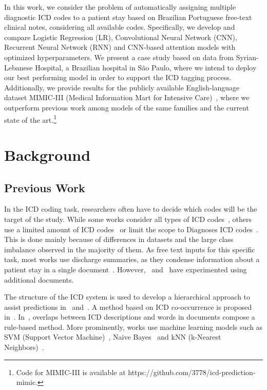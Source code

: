 \documentclass[runningheads]{llncs}
\begin{document}
In this work, we consider the problem of automatically assigning multiple diagnostic ICD codes to a patient stay based on Brazilian Portuguese free-text clinical notes, considering all available codes. Specifically, we develop and compare Logistic Regression (LR), Convolutional Neural Network (CNN), Recurrent Neural Network (RNN) and CNN-based attention models with optimized hyperparameters. We present a case study based on data from Syrian-Lebanese Hospital, a Brazilian hospital in São Paulo, where we intend to deploy our best performing model in order to support the ICD tagging process. Additionally, we provide results for the publicly available English-language dataset MIMIC-III (Medical Information Mart for Intensive Care)~\cite{johnsonMIMICIIIClinical2016,johnsonMIMICIIIFreelyAccessible2016}, where we outperform previous work among models of the same families and the current state of the art.\footnote{Code for MIMIC-III is available at https://github.com/3778/icd-prediction-mimic.}

\section{Background}

\subsection{Previous Work}

In the ICD coding task, researchers often have to decide which codes will be the target of the study. While some works consider all types of ICD codes~\cite{xuMultimodalMachineLearning2019}, others use a limited amount of ICD codes~\cite{santosUsingDeepConvolutional2018} or limit the scope to Diagnoses ICD codes~\cite{liAutomatedICD9Coding2019a}. This is done mainly because of differences in datasets and the large class imbalance observed in the majority of them. As free text inputs for this specific task, most works use discharge summaries, as they condense information about a patient stay in a single document~\cite{mullenbachExplainablePredictionMedical2018}. However,~\cite{duarteDeepNeuralModels2018} and~\cite{xuMultimodalMachineLearning2019} have experimented using additional documents.

The structure of the ICD system is used to develop a hierarchical approach to assist predictions in~\cite{baumelMultiLabelClassificationPatient2017} and~\cite{perotteDiagnosisCodeAssignment2014}. A method based on ICD co-occurrence is proposed in~\cite{subotinMethodModelingCooccurrence2016}. In~\cite{crammerAutomaticCodeAssignment2007}, overlaps between ICD descriptions and words in documents compose a rule-based method. More prominently, works use machine learning models such as SVM (Support Vector Machine)~\cite{perotteDiagnosisCodeAssignment2014}, Naive Bayes~\cite{pakhomovAutomatingAssignmentDiagnosis2006,medoriMachineLearningFeatures2010a} and kNN (k-Nearest Neighbors)~\cite{ruchEpisodesCareDiagnosis2008}.
\end{document}
